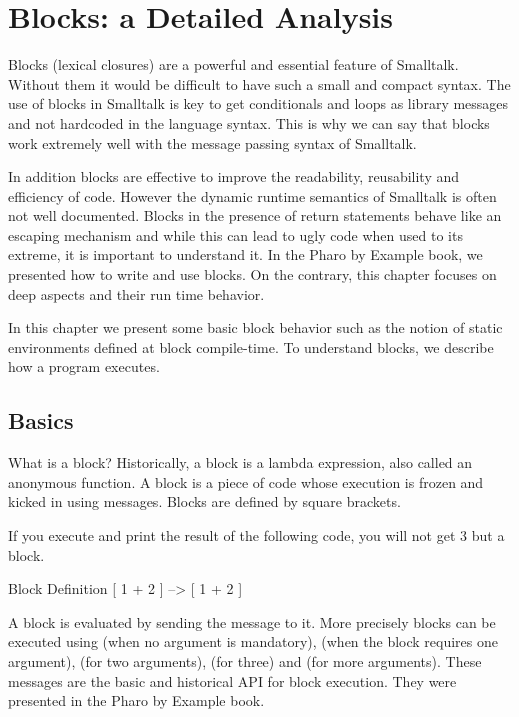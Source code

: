 \documentclass[a4paper,10pt,twoside]{book}
\begin{document}
\fi
\sloppy
\chapter{Blocks: a Detailed Analysis}

Blocks (lexical closures) are a powerful and essential feature of Smalltalk. Without them it
would be difficult to have such a small and compact syntax. The use of blocks in Smalltalk
is key to get conditionals and loops as library messages and not hardcoded in the language syntax. This is why we can say that
blocks work extremely well with the message passing syntax of Smalltalk.

In addition blocks are  effective to improve the readability, reusability and efficiency of code.
However the dynamic runtime semantics of Smalltalk is often not well documented. Blocks in the presence of return statements behave like an escaping mechanism and while this can lead to ugly code when used to its extreme, it is important to understand it. In the Pharo by Example book, we presented how to write and use blocks. On the contrary, this chapter focuses on deep aspects and their run time behavior.

In this chapter we present some basic block behavior such as the notion of static environments defined at block compile-time. To understand blocks, we describe how  a program executes.

\section{Basics}

What is a block? Historically, a block is a lambda expression, also called an anonymous function. A block is a piece of code whose execution is frozen and kicked in using messages. Blocks are defined by square brackets.

If you execute and print the result of the following code, you will not get 3 but a block.

\begin{code}{Block Definition}
[ 1 + 2 ] --> [ 1 + 2 ]
\end{code}

 A block is evaluated by sending the  message to it. More precisely blocks can be executed using  (when no argument is mandatory),  (when the block requires one argument),  (for two arguments),  (for three) and  (for more arguments). These messages are the basic and historical API for block execution. They were presented in the Pharo by Example book.
\end{document}
